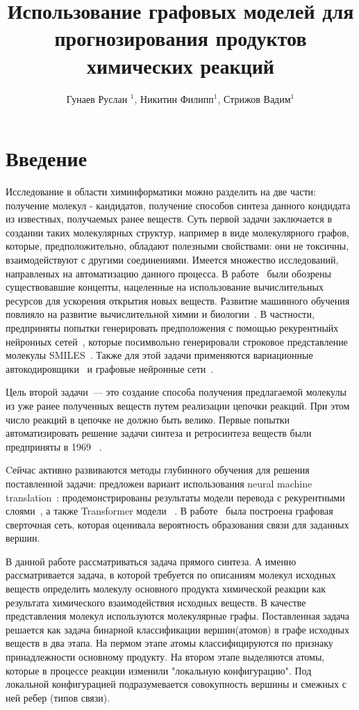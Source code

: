 \documentclass[12pt, twoside]{article}
\title
[Использование графовых моделей для прогнозирования продуктов химических реакций]
{Использование графовых моделей для прогнозирования продуктов химических реакций}
\author{Гунаев Руслан $^1$, Никитин Филипп$^1$, Стрижов Вадим$^1$}
\begin{document}
\maketitle
\section{Введение}

Исследование в области химинформатики можно разделить на две части: получение молекул - кандидатов, получение способов синтеза данного кондидата из известных, получаемых ранее веществ. Суть первой задачи заключается в создании таких молекулярных структур, например в виде молекулярного графов, которые, предположительно, обладают полезными свойствами: они не токсичны, взаимодействуют с другими соединениями.  Имеется множество исследований, направленых на автоматизацию данного процесса. В работе~\cite{schneider2005computer} были обозрены существовавшие концепты, нацеленные на использование вычислительных ресурсов для ускорения открытия новых веществ.  Развитие машинного обучения повлияло на развитие вычислительной химии и биологии~\cite{butler2018machine}. В частности, предприняты попытки генерировать предположения с помощью рекурентныйх нейронных сетей~\cite{olivecrona2017molecular, gomez2018automatic}, которые посимвольно генерировали строковое представление молекулы SMILES~\cite{weininger1988smiles}. Также для этой задачи применяются вариационные автокодировщики~\cite{dai2018syntax} и графовые нейронные сети~\cite{de2018molgan, duvenaud2015convolutional}.   

Цель второй задачи~--- это создание способа получения предлагаемой молекулы из уже ранее полученных веществ путем реализации цепочки реакций. При этом число реакций в цепочке не должно быть велико. Первые попытки автоматизировать решение задачи синтеза и ретросинтеза веществ были предприняты в 1969 ~\cite{corey1969computer}.

Cейчас активно развиваются методы глубинного обучения для решения поставленной задачи: предложен вариант использования neural machine translation~\cite{bahdanau2014neural}: продемонстрированы результаты модели перевода с рекурентными слоями~\cite{schwaller2018found}, а также Transformer модели ~\cite{schwaller2018molecular}.  В работе~\cite{coley2018graph} была построена графовая сверточная сеть, которая оценивала вероятность образования связи для заданных вершин.

В данной работе рассматриваться задача прямого синтеза. А именно рассматривается задача, в которой требуется по описаниям молекул исходных веществ определить молекулу основного продукта химической реакции как результата химического взаимодействия исходных веществ. В качестве представления молекул используются молекулярные графы. Поставленная задача решается как задача бинарной классификации вершин(атомов) в графе исходных веществ в два этапа. На пермом этапе атомы классифицируются по признаку принадлежности основному продукту. На втором этапе выделяются атомы, которые в процессе реакции изменили "локальную конфигурацию". Под локальной конфигурацией подразумевается совокупность вершины и смежных с ней ребер (типов связи).
\end{document}
